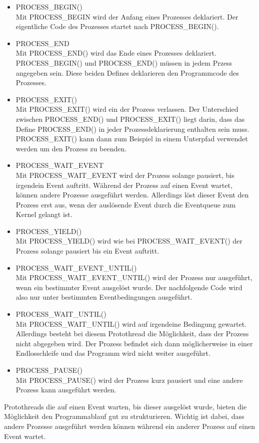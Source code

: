 	\begin{itemize}
		\item PROCESS\_BEGIN()\\
		Mit PROCESS\_BEGIN wird der Anfang eines Prozesses deklariert. Der eigentliche Code des Prozesses startet nach PROCESS\_BEGIN().
		\item PROCESS\_END\\
		Mit PROCESS\_END() wird das Ende eines Prozesses deklariert. PROCESS\_BEGIN() und PROCESS\_END() müssen in jedem Przess angegeben sein. Diese beiden Defines deklarieren den Programmcode des Prozesses.
		\item PROCESS\_EXIT()\\
		Mit PROCESS\_EXIT() wird ein der Prozess verlassen. Der Unterschied zwischen PROCESS\_END() und PROCESS\_EXIT() liegt darin, dass das Define PROCESS\_END() in jeder Prozessdeklarierung enthalten sein muss. PROCESS\_EXIT() kann dann zum Beispiel in einem Unterpfad verwendet werden um den Prozess zu beenden.
		\item PROCESS\_WAIT\_EVENT\\
		Mit PROCESS\_WAIT\_EVENT wird der Prozess solange pausiert, bis irgendein Event auftritt. Während der Prozess auf einen Event wartet, können andere Prozesse ausgeführt werden. Allerdings löst dieser Event den Prozess erst aus, wenn der auslösende Event durch die Eventqueue zum Kernel gelangt ist.
		\item PROCESS\_YIELD()\\
		Mit PROCESS\_YIELD() wird wie bei PROCESS\_WAIT\_EVENT() der Prozess solange pausiert bis ein Event auftritt.
		\item PROCESS\_WAIT\_EVENT\_UNTIL()\\
		Mit PROCESS\_WAIT\_EVENT\_UNTIL() wird der Prozess nur ausgeführt, wenn ein bestimmter Event ausgelöst wurde. Der nachfolgende Code wird also nur unter bestimmten Eventbedingungen ausgeführt.
		\item PROCESS\_WAIT\_UNTIL()\\
		Mit PROCESS\_WAIT\_UNTIL() wird auf irgendeine Bedingung gewartet. Allerdings besteht bei diesem Protothread die Möglichkeit, dass der Prozess nicht abgegeben wird. Der Prozess befindet sich dann möglicherweise in einer Endlosschleife und das Programm wird nicht weiter ausgeführt.
		\item PROCESS\_PAUSE()\\
		Mit PROCESS\_PAUSE() wird der Prozess kurz pausiert und eine andere Prozess kann ausgeführt werden.
	\end{itemize}
	Protothreads die auf einen Event warten, bis dieser ausgelöst wurde, bieten die Möglichkeit den Programmablauf gut zu strukturieren. Wichtig ist dabei, dass andere Prozesse ausgeführt werden können während ein anderer Prozess auf einen Event wartet.
	
